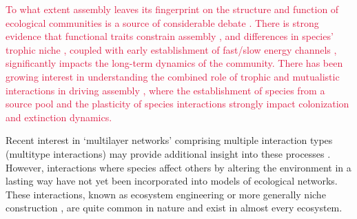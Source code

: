 \documentclass[twocolumn,preprintnumbers,amsmath,amssymb,superscriptaddress,linenumbers]{revtex4-1}
\newcommand{\rev}[1]{\textcolor{crimson}{#1}}
\begin{document}
\rev{To what extent assembly leaves its fingerprint on the structure and function of ecological communities is a source of considerable debate \cite{Hubbell2001,Tilman2004,Fukami2015}.
There is strong evidence that functional traits constrain assembly \cite{Kraft2008,ODwyer2009,Fukami2015}, and differences in species' trophic niche \cite{Brown2002,Piechnik2008}, coupled with early establishment of fast/slow energy channels \cite{Fahimipour2014}, significantly impacts the long-term dynamics of the community.
There has been growing interest in understanding the combined role of trophic and mutualistic interactions in driving assembly \cite{Barbier2018,Campbell2011}, where the establishment of species from a source pool \cite{Luh1993,Law1996,Campbell2011} and the plasticity of species interactions \cite{Valdovinos2010,RamosJiliberto2012,Valdovinos2016,Ponisio2019} strongly impact colonization and extinction dynamics.
}

Recent interest in `multilayer networks' comprising multiple interaction types (multitype interactions) may provide additional insight into these processes \cite{Kefi2016,Pilosof2017}. 
However, interactions where species affect others by altering the environment in a lasting way have not yet been incorporated into models of ecological networks. 
These interactions, known as ecosystem engineering \cite{Lawton1994,OdlingSmee2013} or more generally niche construction \cite{OdlingSmee2013b,Fukami2015}, are quite common in nature and exist in almost every ecosystem.
\end{document}
